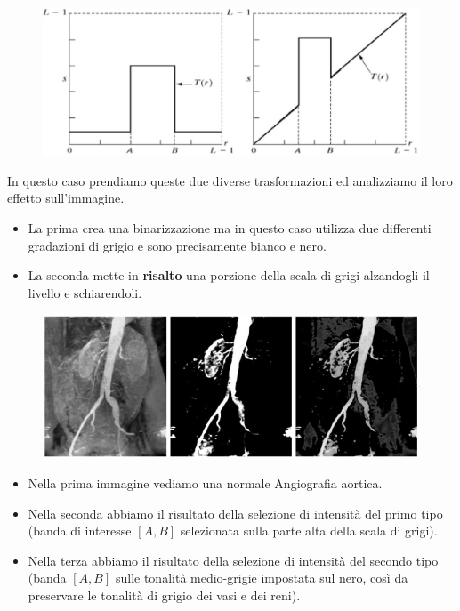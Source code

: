 \begin{figure}[H]
    \centering
    \includegraphics[width=\linewidth, keepaspectratio]{capitoli/immagini/imgs/trasformazioni_lineari_esempio_7.jpg}
\end{figure}

In questo caso prendiamo queste due diverse trasformazioni ed analizziamo il loro effetto sull'immagine.

\begin{itemize}
    \item La prima crea una binarizzazione ma in questo caso utilizza due differenti gradazioni di grigio e sono precisamente bianco e nero.
    \item La seconda mette in \textbf{risalto} una porzione della scala di grigi alzandogli il livello e schiarendoli.
\end{itemize}

\begin{figure}[H]
    \centering
    \includegraphics[width=\linewidth, keepaspectratio]{capitoli/immagini/imgs/angiografie_esempio_7.jpg}
\end{figure}

\begin{itemize}
    \item Nella prima immagine vediamo una normale Angiografia aortica.
    \item Nella seconda abbiamo il risultato della selezione di intensità del primo tipo (banda di
          interesse $[A, B]$ selezionata sulla parte alta della scala di grigi).
    \item Nella terza abbiamo il risultato della selezione di intensità del secondo tipo (banda
          $[A, B]$ sulle tonalità medio-grigie impostata sul nero, così da
          preservare le tonalità di grigio dei vasi e dei reni).
\end{itemize}

